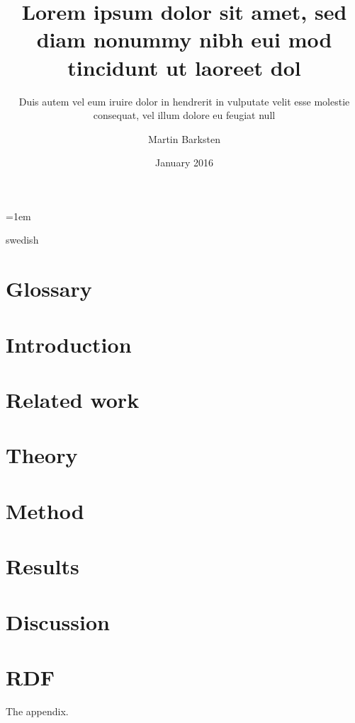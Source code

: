 \documentclass[a4paper,11pt]{kth-mag}
\title{Lorem ipsum dolor sit amet, sed diam nonummy nibh eui
       mod tincidunt ut laoreet dol}
\subtitle{Duis autem vel eum iruire dolor in hendrerit in
          vulputate velit esse molestie consequat, vel illum
          dolore eu feugiat null}
\author{Martin Barksten}
\date{January 2016}
\begin{document}
\lstset{basicstyle=\ttfamily,breaklines=true}
\lstset{frame=lines}
\emergencystretch=1em

\frontmatter
\pagestyle{empty}
\removepagenumbers
\maketitle
{}
\begin{abstract}
    
\end{abstract}
\clearpage
\begin{foreignabstract}{swedish}
    
\end{foreignabstract}
\clearpage
\tableofcontents*
\clearpage
\listoffigures
\mainmatter
\pagestyle{newchap}

\chapter{Glossary} \label{chap:glossary}
    
\chapter{Introduction} \label{chap:introduction}
    
\chapter{Related work} \label{chap:relatedwork}
    
\chapter{Theory} \label{chap:theory}
    
\chapter{Method} \label{chap:method}
    
\chapter{Results} \label{chap:results}
    
\chapter{Discussion} \label{chap:discussion}
    
\nocite{*}
\printbibliography

\appendix
\addappheadtotoc
\chapter{RDF}\label{appA}

The appendix.
\end{document}
